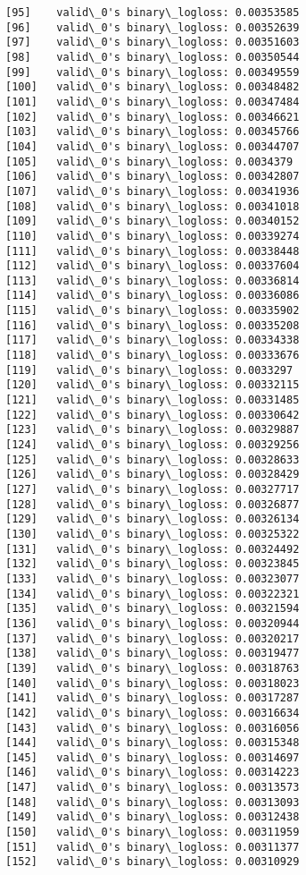 \documentclass[11pt]{article}
\begin{document}
\begin{Verbatim}[commandchars=\\\{\}]
[95]	valid\_0's binary\_logloss: 0.00353585
[96]	valid\_0's binary\_logloss: 0.00352639
[97]	valid\_0's binary\_logloss: 0.00351603
[98]	valid\_0's binary\_logloss: 0.00350544
[99]	valid\_0's binary\_logloss: 0.00349559
[100]	valid\_0's binary\_logloss: 0.00348482
[101]	valid\_0's binary\_logloss: 0.00347484
[102]	valid\_0's binary\_logloss: 0.00346621
[103]	valid\_0's binary\_logloss: 0.00345766
[104]	valid\_0's binary\_logloss: 0.00344707
[105]	valid\_0's binary\_logloss: 0.0034379
[106]	valid\_0's binary\_logloss: 0.00342807
[107]	valid\_0's binary\_logloss: 0.00341936
[108]	valid\_0's binary\_logloss: 0.00341018
[109]	valid\_0's binary\_logloss: 0.00340152
[110]	valid\_0's binary\_logloss: 0.00339274
[111]	valid\_0's binary\_logloss: 0.00338448
[112]	valid\_0's binary\_logloss: 0.00337604
[113]	valid\_0's binary\_logloss: 0.00336814
[114]	valid\_0's binary\_logloss: 0.00336086
[115]	valid\_0's binary\_logloss: 0.00335902
[116]	valid\_0's binary\_logloss: 0.00335208
[117]	valid\_0's binary\_logloss: 0.00334338
[118]	valid\_0's binary\_logloss: 0.00333676
[119]	valid\_0's binary\_logloss: 0.0033297
[120]	valid\_0's binary\_logloss: 0.00332115
[121]	valid\_0's binary\_logloss: 0.00331485
[122]	valid\_0's binary\_logloss: 0.00330642
[123]	valid\_0's binary\_logloss: 0.00329887
[124]	valid\_0's binary\_logloss: 0.00329256
[125]	valid\_0's binary\_logloss: 0.00328633
[126]	valid\_0's binary\_logloss: 0.00328429
[127]	valid\_0's binary\_logloss: 0.00327717
[128]	valid\_0's binary\_logloss: 0.00326877
[129]	valid\_0's binary\_logloss: 0.00326134
[130]	valid\_0's binary\_logloss: 0.00325322
[131]	valid\_0's binary\_logloss: 0.00324492
[132]	valid\_0's binary\_logloss: 0.00323845
[133]	valid\_0's binary\_logloss: 0.00323077
[134]	valid\_0's binary\_logloss: 0.00322321
[135]	valid\_0's binary\_logloss: 0.00321594
[136]	valid\_0's binary\_logloss: 0.00320944
[137]	valid\_0's binary\_logloss: 0.00320217
[138]	valid\_0's binary\_logloss: 0.00319477
[139]	valid\_0's binary\_logloss: 0.00318763
[140]	valid\_0's binary\_logloss: 0.00318023
[141]	valid\_0's binary\_logloss: 0.00317287
[142]	valid\_0's binary\_logloss: 0.00316634
[143]	valid\_0's binary\_logloss: 0.00316056
[144]	valid\_0's binary\_logloss: 0.00315348
[145]	valid\_0's binary\_logloss: 0.00314697
[146]	valid\_0's binary\_logloss: 0.00314223
[147]	valid\_0's binary\_logloss: 0.00313573
[148]	valid\_0's binary\_logloss: 0.00313093
[149]	valid\_0's binary\_logloss: 0.00312438
[150]	valid\_0's binary\_logloss: 0.00311959
[151]	valid\_0's binary\_logloss: 0.00311377
[152]	valid\_0's binary\_logloss: 0.00310929

\end{Verbatim}
\end{document}

